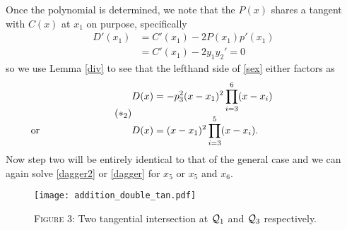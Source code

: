 \documentclass[english,11pt,a4paper]{article}
\begin{document}
\begin{case}
  Once the polynomial is determined, we note that the $P(x)$ shares a tangent with $C(x)$ at $x_1$ on purpose, specifically
  \begin{align*}
    D'(x_1) &= C'(x_1) - 2 P(x_1)p'(x_1)\\
            &= C'(x_1) - 2 y_1 y_2' = 0
  \end{align*}
  so we use Lemma \ref{div} to see that the lefthand side of \eqref{sex} either factors as
  \begin{align} \tag{$*_2$} \begin{split}
    D(x) &= -p_3^2(x-x_1)^2 \prod_{i=3}^6(x-x_i)\\
    \rlap{\hspace{-37mm} or}
    D(x) &= (x-x_1)^2 \prod_{i=3}^5(x-x_i).
  \end{split} \end{align}
  Now step two will be entirely identical to that of the general case and we can again solve \eqref{dagger2} or \eqref{dagger} for $x_5$ or $x_5$ and $x_6$.
\end{case}

\begin{figure}[ht]
  \fline
  \begin{center}
    \vspace{1mm}
    \texttt{[image: addition\_double\_tan.pdf]}

    {\scshape Figure 3}: Two tangential intersection at $\mathcal{Q}_1$ and $\mathcal{Q}_3$ respectively.
  \end{center}
  \vspace{-1.5mm}
  \fline
\end{figure}
\end{document}
